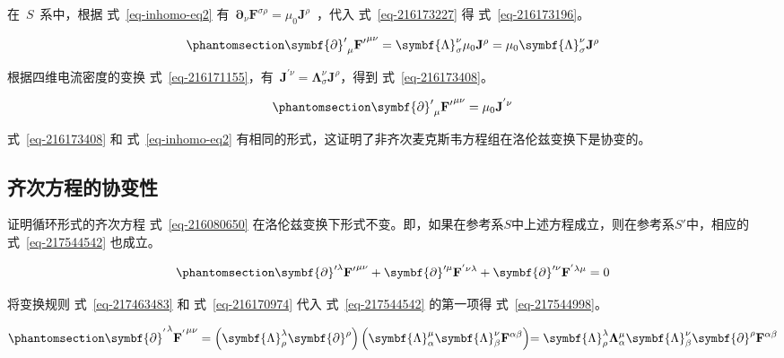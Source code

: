 \documentclass[
  chinese,
  a4paper,
  UTF8,
  12pt,
  oneside,
  openany]{ctexbook}
\begin{document}
在~\(S\)~系中，根据 式~\ref{eq-inhomo-eq2}
有~\(\symbf{\partial}_{\nu}\mathbf{F}^{\sigma\rho} = \mu_{0}\mathbf{J}^{\rho}\)~，代入
式~\ref{eq-216173227} 得 式~\ref{eq-216173196}。

\begin{equation}\protect\phantomsection\label{eq-216173196}{{{\symbf{\partial}'}_{\mu}\mathbf{F}'}^{\mu\nu} = \symbf{\Lambda}_{\sigma}^{\nu}\mu_{0}\mathbf{J}^{\rho} = \mu_{0}\symbf{\Lambda}_{\sigma}^{\nu}\mathbf{J}^{\rho}}\end{equation}

根据四维电流密度的变换
式~\ref{eq-216171155}，有~\(\mathbf{J}^{'\nu} = \symbf{\Lambda}_{\sigma}^{\nu}\mathbf{J}^{\rho}\)，得到
式~\ref{eq-216173408}。

\begin{equation}\protect\phantomsection\label{eq-216173408}{
{{\symbf{\partial}'}_{\mu}\mathbf{F}'}^{\mu\nu} = \mu_{0}\mathbf{J}^{'\nu}
}\end{equation}

式~\ref{eq-216173408} 和 式~\ref{eq-inhomo-eq2}
有相同的形式，这证明了非齐次麦克斯韦方程组在洛伦兹变换下是协变的。

\subsection{齐次方程的协变性}\label{ux9f50ux6b21ux65b9ux7a0bux7684ux534fux53d8ux6027}

证明循环形式的齐次方程 式~\ref{eq-216080650}
在洛伦兹变换下形式不变。即，如果在参考系\(S\)中上述方程成立，则在参考系\(S′\)中，相应的
式~\ref{eq-217544542} 也成立。

\begin{equation}\protect\phantomsection\label{eq-217544542}{
\symbf{\partial}'^{\lambda}\mathbf{F'}^{\mu\nu} + \symbf{\partial}'^{\mu}\mathbf{F}^{'\nu\lambda} + \symbf{\partial}'^{\nu}\mathbf{F}^{'\lambda\mu} = 0
}\end{equation}

将变换规则 式~\ref{eq-217463483} 和 式~\ref{eq-216170974} 代入
式~\ref{eq-217544542} 的第一项得 式~\ref{eq-217544998}。

\begin{equation}\protect\phantomsection\label{eq-217544998}{
{{\symbf{\partial}^{\mathbf{'}}}^{\lambda}{\mathbf{F}^{\mathbf{'}}}^{\mu\nu} = \left( \symbf{\Lambda}_{\rho}^{\lambda}\symbf{\partial}^{\rho} \right)\left( \symbf{\Lambda}_{\alpha}^{\mu}\symbf{\Lambda}_{\beta}^{\nu}\mathbf{F}^{\alpha\beta} \right)
  }{= \symbf{\Lambda}_{\rho}^{\lambda}\mathbf{\Lambda}_{\alpha}^{\mu}\symbf{\Lambda}_{\beta}^{\nu}\symbf{\partial}^{\rho}\mathbf{F}^{\alpha\beta}}
}\end{equation}
\end{document}
